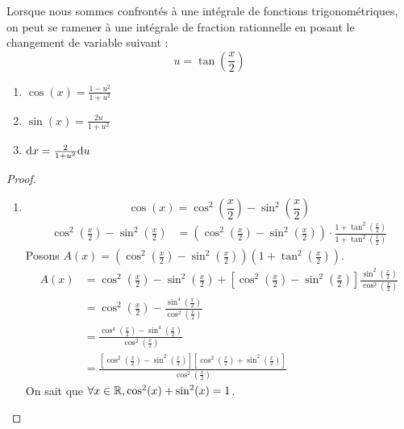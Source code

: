 Lorsque nous sommes confrontés à une intégrale de fonctions trigonométriques, on peut se ramener à une intégrale de fraction rationnelle en posant le changement de variable suivant :
\[ u = \tan(\frac{x}{2}) \]
\begin{multicols}{3}
    \begin{enumerate}
        \item $\cos(x) = \frac{1 - u^2}{1 + u^2}$
        \item $\sin(x) = \frac{2u}{1 + u^2}$
        \item $\diffd x = \frac{2}{1 + u^2} \diffd u$
    \end{enumerate}
\end{multicols}
\begin{proof}
	\leavevmode
    \begin{enumerate}
        \item \[ \cos(x) = \cos^2\left( \frac{x}{2} \right) - \sin^2\left( \frac{x}{2} \right) \]
            \begin{align*}
                \cos^2\left( \frac{x}{2} \right) - \sin^2\left( \frac{x}{2} \right) &= \left( \cos^2\left( \frac{x}{2} \right) - \sin^2\left( \frac{x}{2} \right) \right) \cdot \frac{1 + \tan^2 \left( \frac{x}{2} \right)}{1 + \tan^2 \left( \frac{x}{2} \right)}
            \end{align*}
            Posons $A(x) = \left( \cos^2\left( \frac{x}{2} \right) - \sin^2\left( \frac{x}{2} \right) \right) \left( 1 + \tan^2\left( \frac{x}{2} \right) \right)$.
            \begin{align*}
                A(x) &= \cos^2\left( \frac{x}{2} \right) - \sin^2\left( \frac{x}{2} \right) + \left[ \cos^2\left( \frac{x}{2} \right) - \sin^2\left( \frac{x}{2} \right) \right] \frac{\sin^2 \left( \frac{x}{2} \right)}{\cos^2 \left( \frac{x}{2} \right)} \\
                &= \cos^2 \left( \frac{x}{2} \right) - \frac{\sin^4 \left( \frac{x}{2} \right)}{\cos^2 \left( \frac{x}{2} \right)} \\
                &= \frac{\cos^4 \left( \frac{x}{2} \right) - \sin^4 \left( \frac{x}{2} \right)}{\cos^2 \left( \frac{x}{2} \right)}\\
                &= \frac{\left[ \cos^2\left( \frac{x}{2} \right) - \sin^2 \left( \frac{x}{2} \right) \right] \left[ \cos^2\left( \frac{x}{2} \right) + \sin^2 \left( \frac{x}{2} \right) \right]}{\cos^2 \left( \frac{x}{2} \right)}
            \end{align*}
             On sait que $\forall x \in \mathbb{R}, \cos^2(x) + \sin^2(x) = 1$.

\end{enumerate}
\end{proof}
